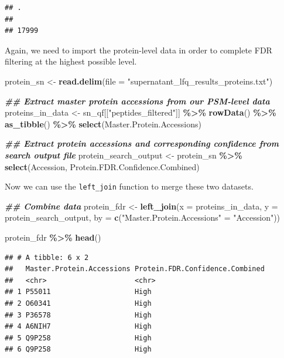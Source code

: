 \documentclass[9pt,a4paper,]{extarticle}
\newenvironment{Shaded}{\begin{snugshade}}{\end{snugshade}}
\newcommand{\AttributeTok}[1]{\textcolor[rgb]{0.13,0.29,0.53}{#1}}
\newcommand{\DocumentationTok}[1]{\textcolor[rgb]{0.56,0.35,0.01}{\textbf{\textit{#1}}}}
\newcommand{\FunctionTok}[1]{\textcolor[rgb]{0.13,0.29,0.53}{\textbf{#1}}}
\newcommand{\NormalTok}[1]{#1}
\newcommand{\OtherTok}[1]{\textcolor[rgb]{0.56,0.35,0.01}{#1}}
\newcommand{\SpecialCharTok}[1]{\textcolor[rgb]{0.81,0.36,0.00}{\textbf{#1}}}
\newcommand{\StringTok}[1]{\textcolor[rgb]{0.31,0.60,0.02}{#1}}
\begin{document}
\begin{verbatim}
## .
##       
## 17999
\end{verbatim}

Again, we need to import the protein-level data in order to complete FDR filtering
at the highest possible level.

\begin{Shaded}
\begin{Highlighting}[]
\NormalTok{protein\_sn }\OtherTok{\textless{}{-}} \FunctionTok{read.delim}\NormalTok{(}\AttributeTok{file =} \StringTok{"supernatant\_lfq\_results\_proteins.txt"}\NormalTok{)}

\DocumentationTok{\#\# Extract master protein accessions from our PSM{-}level data}
\NormalTok{proteins\_in\_data }\OtherTok{\textless{}{-}}\NormalTok{ sn\_qf[[}\StringTok{"peptides\_filtered"}\NormalTok{]] }\SpecialCharTok{\%\textgreater{}\%}
  \FunctionTok{rowData}\NormalTok{() }\SpecialCharTok{\%\textgreater{}\%}
  \FunctionTok{as\_tibble}\NormalTok{() }\SpecialCharTok{\%\textgreater{}\%}
  \FunctionTok{select}\NormalTok{(Master.Protein.Accessions)}

\DocumentationTok{\#\# Extract protein accessions and corresponding confidence from search output file}
\NormalTok{protein\_search\_output }\OtherTok{\textless{}{-}}\NormalTok{ protein\_sn }\SpecialCharTok{\%\textgreater{}\%}
  \FunctionTok{select}\NormalTok{(Accession, Protein.FDR.Confidence.Combined)}
\end{Highlighting}
\end{Shaded}

Now we can use the \texttt{left\_join} function to merge these two datasets.

\begin{Shaded}
\begin{Highlighting}[]
\DocumentationTok{\#\# Combine data}
\NormalTok{protein\_fdr }\OtherTok{\textless{}{-}} \FunctionTok{left\_join}\NormalTok{(}\AttributeTok{x =}\NormalTok{ proteins\_in\_data, }
                         \AttributeTok{y =}\NormalTok{ protein\_search\_output, }
                         \AttributeTok{by =} \FunctionTok{c}\NormalTok{(}\StringTok{"Master.Protein.Accessions"} \OtherTok{=} \StringTok{"Accession"}\NormalTok{))}

\NormalTok{protein\_fdr }\SpecialCharTok{\%\textgreater{}\%}
  \FunctionTok{head}\NormalTok{()}
\end{Highlighting}
\end{Shaded}

\begin{verbatim}
## # A tibble: 6 x 2
##   Master.Protein.Accessions Protein.FDR.Confidence.Combined
##   <chr>                     <chr>                          
## 1 P55011                    High                           
## 2 O60341                    High                           
## 3 P36578                    High                           
## 4 A6NIH7                    High                           
## 5 Q9P258                    High                           
## 6 Q9P258                    High
\end{verbatim}
\end{document}
